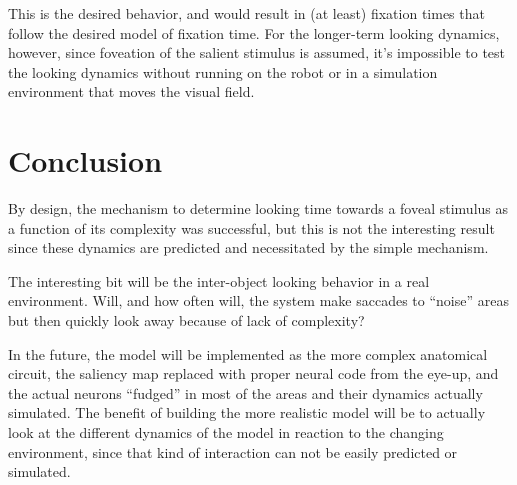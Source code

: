 \documentclass[12pt]{article}
\begin{document}
This is the desired behavior, and would result in (at least) fixation
times that follow the desired model of fixation time. For the
longer-term looking dynamics, however, since foveation of the salient
stimulus is assumed, it's impossible to test the looking dynamics
without running on the robot or in a simulation environment that moves
the visual field.

\section{Conclusion}
By design, the mechanism to determine looking time towards a foveal
stimulus as a function of its complexity was successful, but this is
not the interesting result since these dynamics are predicted and
necessitated by the simple mechanism.

The interesting bit will be the inter-object looking behavior in a
real environment. Will, and how often will, the system make saccades
to ``noise'' areas but then quickly look away because of lack of
complexity?

In the future, the model will be implemented as the more complex
anatomical circuit, the saliency map replaced with proper neural code
from the eye-up, and the actual neurons ``fudged'' in most of the
areas and their dynamics actually simulated. The benefit of building
the more realistic model will be to actually look at the different
dynamics of the model in reaction to the changing environment, since
that kind of interaction can not be easily predicted or simulated.

 
\end{document}
